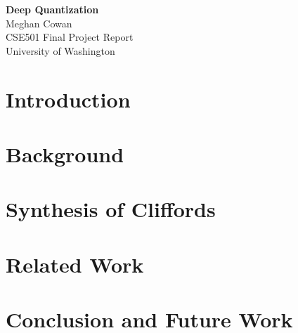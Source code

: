 \documentclass{article}
\begin{document}
\begin{centering}
\noindent
{\Large\textbf{Deep Quantization}} \\
Meghan Cowan\\
CSE501 Final Project Report \\
University of Washington \\
\vspace{3ex}
\end{centering}

\abstract{
}

\vspace{1ex}\noindent

\section{Introduction}


\section{Background}


\section{Synthesis of Cliffords}


\section{Related Work}


\section{Conclusion and Future Work}




\end{document}
